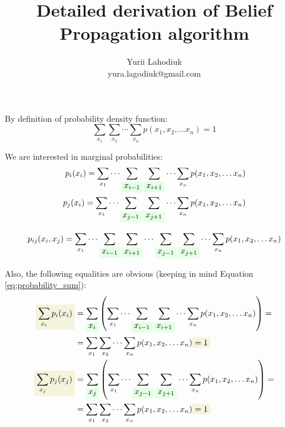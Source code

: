 \documentclass[fleqn,leqno]{article}
\newcommand{\highlight}[1]{\colorbox{green!10}{$\displaystyle#1$}}
\newcommand{\highlightred}[1]{\colorbox{olive!10}{$\displaystyle#1$}}
\begin{document}
\title{Detailed derivation of Belief Propagation algorithm}
\author{Yurii Lahodiuk \\ yura.lagodiuk@gmail.com}
\date{}
\maketitle

By definition of probability density function:
\begin{equation} \label{eq:probability_sum}
\sum_{x_1} \sum_{x_2} \cdots \sum_{x_n}  p(x_1, x_2, \dots x_n) = 1
\end{equation}

We are interested in marginal probabilities:
\begin{equation} \label{eq:marginal_probabilities_one_node}
\begin{split}
p_i(x_i) = \sum_{x_1} \cdots \sum_{ \highlight{ x_{i - 1} } } \sum_{ \highlight{ x_{i + 1} } } \cdots \sum_{x_n} p(x_1, x_2, \dots x_n) \\
p_j(x_i) = \sum_{x_1} \cdots \sum_{ \highlight{ x_{j - 1} } } \sum_{ \highlight{ x_{j + 1} } } \cdots \sum_{x_n} p(x_1, x_2, \dots x_n) \\
\end{split}
\end{equation}

\begin{equation} \label{eq:marginal_probabilities_two_nodes}
\begin{split}
p_{ij}(x_i, x_j) = \sum_{x_1} \cdots \sum_{ \highlight{ x_{i - 1} } } \sum_{ \highlight{ x_{i + 1} } } \cdots \sum_{ \highlight{ x_{j - 1} } } \sum_{ \highlight{ x_{j + 1} } } \cdots \sum_{x_n} p(x_1, x_2, \dots x_n)
\end{split}
\end{equation}

Also, the following equalities are obvious (keeping in mind Equation \eqref{eq:probability_sum}):
\begin{equation} \label{eq:sum_over_states_of_one_node_marginal_probabilities}
\begin{split}
\highlightred{ \sum_{x_i} p_i(x_i) } & =  \sum_{ \highlight{ x_i } } \left( \sum_{x_1} \cdots \sum_{ \highlight{ x_{i - 1} } } \sum_{ \highlight{ x_{i + 1} } } \cdots \sum_{x_n} p(x_1, x_2, \dots x_n) \right) = \\
                               & = \sum_{x_1} \sum_{x_2} \cdots \sum_{x_n}  p(x_1, x_2, \dots x_n) \highlightred{ = 1 } \\
\highlightred{ \sum_{x_j} p_j(x_j) } & = \sum_{ \highlight{ x_j } } \left( \sum_{x_1} \cdots \sum_{ \highlight{ x_{j - 1} } } \sum_{ \highlight{ x_{j + 1} } } \cdots \sum_{x_n} p(x_1, x_2, \dots x_n) \right) = \\
                               & = \sum_{x_1} \sum_{x_2} \cdots \sum_{x_n}  p(x_1, x_2, \dots x_n) \highlightred{ = 1 }
\end{split}
\end{equation}
\end{document}
